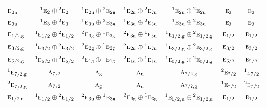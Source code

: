 \documentclass[10pt,a4paper]{article}
\numberwithin{equation}{section}
\newcommand{\irr}[1]{\text{\normalfont\scshape #1}}
\newcommand{\conjpair}[1]{{}^{#1}}
\newcommand{\ptag}[1]{\mathrm{#1}}
\begin{document}
{\begin{longtable}{@{}lcccccc@{}}
$\irr{e}_{2\ptag{u}}$ & $\conjpair{1}\irr{e}_{2}\oplus \conjpair{2}\irr{e}_{2}$ & $\conjpair{1}\irr{e}_{2\ptag{u}}\oplus \conjpair{2}\irr{e}_{2\ptag{u}}$ & $\conjpair{1}\irr{e}_{2\ptag{u}}\oplus \conjpair{2}\irr{e}_{2\ptag{u}}$ & $\conjpair{1}\irr{e}_{2\ptag{u}}\oplus \conjpair{2}\irr{e}_{2\ptag{u}}$ & $\irr{e}_{2}$ & $\irr{e}_{2}$\\
$\irr{e}_{3\ptag{u}}$ & $\conjpair{1}\irr{e}_{3}\oplus \conjpair{2}\irr{e}_{3}$ & $\conjpair{1}\irr{e}_{3\ptag{u}}\oplus \conjpair{2}\irr{e}_{3\ptag{u}}$ & $\conjpair{1}\irr{e}_{3\ptag{u}}\oplus \conjpair{2}\irr{e}_{3\ptag{u}}$ & $\conjpair{1}\irr{e}_{3\ptag{u}}\oplus \conjpair{2}\irr{e}_{3\ptag{u}}$ & $\irr{e}_{3}$ & $\irr{e}_{3}$\\
$\irr{e}_{1/2,\ptag{g}}$ & $\conjpair{1}\irr{e}_{1/2}\oplus \conjpair{2}\irr{e}_{1/2}$ & $\conjpair{2}\irr{e}_{3\ptag{g}}\oplus \conjpair{1}\irr{e}_{3\ptag{g}}$ & $\conjpair{2}\irr{e}_{3\ptag{u}}\oplus \conjpair{1}\irr{e}_{3\ptag{u}}$ & $\conjpair{1}\irr{e}_{1/2,\ptag{g}}\oplus \conjpair{2}\irr{e}_{1/2,\ptag{g}}$ & $\irr{e}_{1/2}$ & $\irr{e}_{1/2}$\\
$\irr{e}_{3/2,\ptag{g}}$ & $\conjpair{1}\irr{e}_{3/2}\oplus \conjpair{2}\irr{e}_{3/2}$ & $\conjpair{2}\irr{e}_{2\ptag{g}}\oplus \conjpair{1}\irr{e}_{2\ptag{g}}$ & $\conjpair{2}\irr{e}_{2\ptag{u}}\oplus \conjpair{1}\irr{e}_{2\ptag{u}}$ & $\conjpair{1}\irr{e}_{3/2,\ptag{g}}\oplus \conjpair{2}\irr{e}_{3/2,\ptag{g}}$ & $\irr{e}_{3/2}$ & $\irr{e}_{3/2}$\\
$\irr{e}_{5/2,\ptag{g}}$ & $\conjpair{1}\irr{e}_{5/2}\oplus \conjpair{2}\irr{e}_{5/2}$ & $\conjpair{2}\irr{e}_{1\ptag{g}}\oplus \conjpair{1}\irr{e}_{1\ptag{g}}$ & $\conjpair{2}\irr{e}_{1\ptag{u}}\oplus \conjpair{1}\irr{e}_{1\ptag{u}}$ & $\conjpair{1}\irr{e}_{5/2,\ptag{g}}\oplus \conjpair{2}\irr{e}_{5/2,\ptag{g}}$ & $\irr{e}_{5/2}$ & $\irr{e}_{5/2}$\\
$\conjpair{1}\irr{e}_{7/2,\ptag{g}}$ & $\irr{a}_{7/2}$ & $\irr{a}_{\ptag{g}}$ & $\irr{a}_{\ptag{u}}$ & $\irr{a}_{7/2,\ptag{g}}$ & $\conjpair{2}\irr{e}_{7/2}$ & $\conjpair{1}\irr{e}_{7/2}$\\
$\conjpair{2}\irr{e}_{7/2,\ptag{g}}$ & $\irr{a}_{7/2}$ & $\irr{a}_{\ptag{g}}$ & $\irr{a}_{\ptag{u}}$ & $\irr{a}_{7/2,\ptag{g}}$ & $\conjpair{1}\irr{e}_{7/2}$ & $\conjpair{2}\irr{e}_{7/2}$\\
$\irr{e}_{1/2,\ptag{u}}$ & $\conjpair{1}\irr{e}_{1/2}\oplus \conjpair{2}\irr{e}_{1/2}$ & $\conjpair{2}\irr{e}_{3\ptag{u}}\oplus \conjpair{1}\irr{e}_{3\ptag{u}}$ & $\conjpair{2}\irr{e}_{3\ptag{g}}\oplus \conjpair{1}\irr{e}_{3\ptag{g}}$ & $\conjpair{1}\irr{e}_{1/2,\ptag{u}}\oplus \conjpair{2}\irr{e}_{1/2,\ptag{u}}$ & $\irr{e}_{1/2}$ & $\irr{e}_{1/2}$\\

\end{longtable}}
\end{document}
